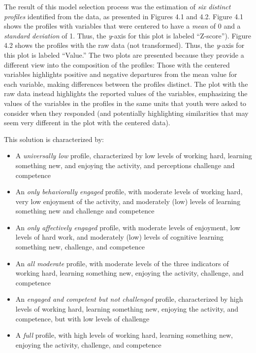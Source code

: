 \documentclass[]{book}
\providecommand{\tightlist}{%
  \setlength{\itemsep}{0pt}\setlength{\parskip}{0pt}}
\theoremstyle{definition}
\theoremstyle{definition}
\theoremstyle{definition}
\theoremstyle{remark}
\begin{document}
The result of this model selection process was the estimation of
\emph{six distinct profiles} identified from the data, as presented in
Figures 4.1 and 4.2. Figure 4.1 shows the profiles with variables that
were centered to have a \emph{mean} of 0 and a \emph{standard deviation}
of 1. Thus, the \emph{y}-axis for this plot is labeled ``Z-score'').
Figure 4.2 shows the profiles with the raw data (not transformed). Thus,
the \emph{y}-axis for this plot is labeled ``Value.'' The two plots are
presented because they provide a different view into the composition of
the profiles: Those with the centered variables highlights positive and
negative departures from the mean value for each variable, making
differences between the profiles distinct. The plot with the raw data
instead highlights the reported values of the variables, emphasizing the
values of the variables in the profiles in the same units that youth
were asked to consider when they responded (and potentially highlighting
similarities that may seem very different in the plot with the centered
data).

This solution is characterized by:

\begin{itemize}
\tightlist
\item
  A \emph{universally low} profile, characterized by low levels of
  working hard, learning something new, and enjoying the activity, and
  perceptions challenge and competence
\item
  An \emph{only behaviorally engaged} profile, with moderate levels of
  working hard, very low enjoyment of the activity, and moderately (low)
  levels of learning something new and challenge and competence
\item
  An \emph{only affectively engaged} profile, with moderate levels of
  enjoyment, low levels of hard work, and moderately (low) levels of
  cognitive learning something new, challenge, and competence
\item
  An \emph{all moderate} profile, with moderate levels of the three
  indicators of working hard, learning something new, enjoying the
  activity, challenge, and competence
\item
  An \emph{engaged and competent but not challenged} profile,
  characterized by high levels of working hard, learning something new,
  enjoying the activity, and competence, but with low levels of
  challenge
\item
  A \emph{full} profile, with high levels of working hard, learning
  something new, enjoying the activity, challenge, and competence
\end{itemize}
\end{document}
